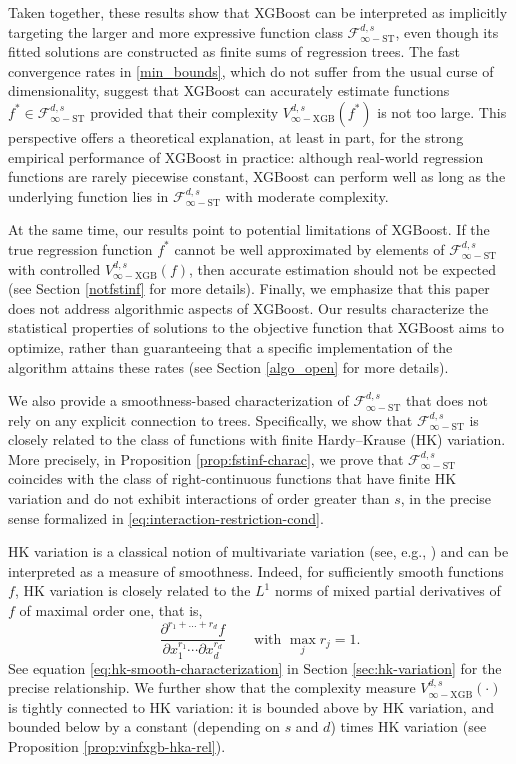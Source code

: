 \documentclass[10pt]{article}
\newcommand{\fstinf}{{\mathcal{F}^{d, s}_{\infty-\text{ST}}}}
\newcommand{\vinfxgb}{{V^{d, s}_{\infty-\text{XGB}}}}
\def\qt#1{\qquad\text{#1}}
\begin{document}
Taken together, these results show that XGBoost can be interpreted as
implicitly targeting the larger and more expressive function class
$\fstinf$, even though its fitted solutions are constructed as finite
sums of regression trees. The fast convergence rates in
\eqref{min_bounds}, which do not suffer from the usual curse of
dimensionality, suggest that XGBoost can accurately estimate functions
$f^* \in \fstinf$ provided that their complexity $\vinfxgb(f^*)$ is
not too large. This perspective offers a theoretical explanation, at
least in part, for the strong empirical performance of XGBoost in
practice: although real-world regression functions are rarely
piecewise constant, XGBoost can perform well as long as the underlying
function lies in $\fstinf$ with moderate complexity.

At the same time, our results point to potential limitations of
XGBoost. If the true regression function $f^*$ cannot be well 
approximated by elements of $\fstinf$ with controlled $\vinfxgb(f)$, 
then accurate estimation should not be expected (see 
Section \ref{notfstinf} for more details). Finally, we emphasize that 
this paper does not address algorithmic aspects of XGBoost. Our results 
characterize the statistical properties of solutions to the objective 
function that XGBoost aims to optimize, rather than guaranteeing that 
a specific implementation of the algorithm attains these rates 
(see Section \ref{algo_open} for more details). 

We also provide a smoothness-based characterization of $\fstinf$ that
does not rely on any explicit connection to trees. Specifically, we
show that $\fstinf$ is closely related to the class of functions with
finite Hardy–Krause (HK) variation. More precisely, in 
Proposition \ref{prop:fstinf-charac}, we prove that $\fstinf$ 
coincides with the class of right-continuous functions that have 
finite HK variation and do not exhibit interactions of order greater 
than $s$, in the precise sense formalized in 
\eqref{eq:interaction-restriction-cond}.

HK variation is a classical notion of multivariate variation (see,
e.g., \citet{leonov1996total, aistleitner2015functions, 
owen2005multidimensional}) and can be interpreted as a measure of
smoothness. Indeed, for sufficiently smooth functions $f$, 
HK variation is closely related to the $L^1$ norms of mixed partial
derivatives of $f$ of maximal order one, that is,
\begin{equation*}
    \frac{\partial^{r_1 + \dots + r_d} f}{\partial x_1^{r_1} \cdots
    \partial x_d^{r_d}} \qt{with $\max_j r_j = 1$}. 
\end{equation*}
See equation \eqref{eq:hk-smooth-characterization} in 
Section \ref{sec:hk-variation} for the precise relationship. We 
further show that the complexity measure $\vinfxgb(\cdot)$ is 
tightly connected to HK variation: it is bounded above by HK 
variation, and bounded below by a constant (depending on $s$ and $d$) 
times HK variation (see Proposition \ref{prop:vinfxgb-hka-rel}).
\end{document}
